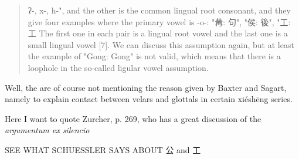 \begin{quote}
ʔ-, x-, h-", and the other is the common lingual root consonant, and they give four examples where the primary vowel is -o-: "冓: 句", "侯: 後", "工: 工 The first one in each pair is a lingual root vowel and the last one is a small lingual vowel [7]. We can discuss this assumption again, but at least the example of "Gong: Gong" is not valid, which means that there is a loophole in the so-called ligular vowel assumption.
\end{quote}

Well, the are of course not mentioning the reason given by Baxter and Sagart, namely to explain contact between velars and glottals in certain xiéshēng series. 

Here I want to quote Zurcher, p. 269, who has a great discussion of the \textit{argumentum ex silencio}

SEE WHAT SCHUESSLER SAYS ABOUT 公 and 工



\begin{table}[]
    \centering
{}
    \caption{Phonetic series gōng 公 (apud \citet[]{Schuessler2015BSrv}}
    \label{tab:my_label}
\end{table}


